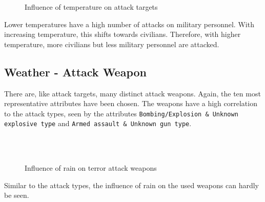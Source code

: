 \newpage

\begin{figure}[!ht]
\centering
    \qquad
    \qquad
    \qquad
    \qquad
    \qquad
\caption{Influence of temperature on attack targets}
\label{fig:example subfigure}
\end{figure}

Lower temperatures have a high number of attacks on military personnel. With increasing temperature, this shifts towards civilians. Therefore, with higher temperature, more civilians but less military personnel are attacked. 

\subsection{Weather - Attack Weapon}
There are, like attack targets, many distinct attack weapons. Again, the ten most representative attributes have been chosen. The weapons have a high correlation to the attack types, seen by the attributes \texttt{Bombing/Explosion \& Unknown explosive type} and \texttt{Armed assault \& Unknown gun type}.

\begin{figure}[!ht]
\centering
    \qquad\\
    \qquad
    \qquad\\
    \qquad
\caption{Influence of rain on terror attack weapons}
\end{figure}

Similar to the attack types, the influence of rain  on the used weapons can hardly be seen.


